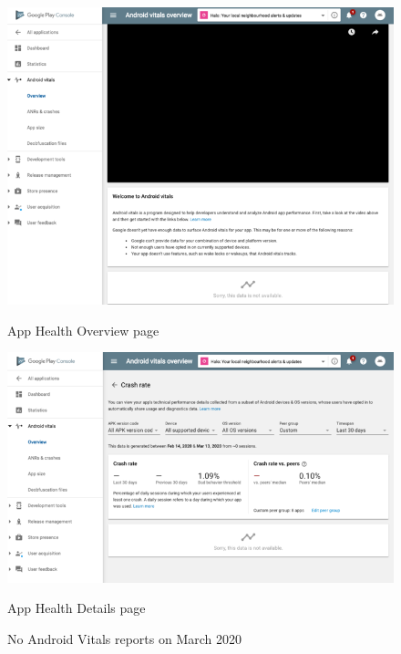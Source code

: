 \begin{figure}[htbp!]
\centering
\begin{minipage}{.45\textwidth}
  \centering
  \includegraphics[width=\textwidth]{images/localhalo/apphealthoverviewplace_5550596_no_data.png}
  \caption{App Health Overview page}
  \label{fig:localhalo-apphealthoverview-no-data-16-mar-2020}
\end{minipage}\hfill%
\begin{minipage}{.45\textwidth}
  \centering
  \includegraphics[width=\textwidth]{images/localhalo/apphealthdetailsplace_55505963_no_data.png}
  \caption{App Health Details page}
  \label{fig:localhalo-apphealthdetails-no-data-16-mar-2020}
\end{minipage}
    \caption{No Android Vitals reports on  March 2020}
    \label{fig:localhalo-android-vitals-no-data-16-march-2020}
\end{figure}

